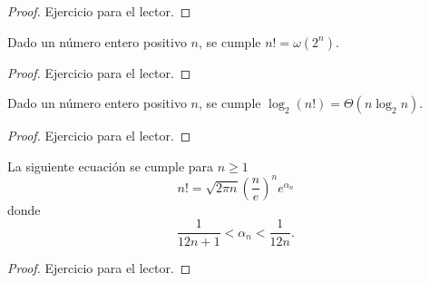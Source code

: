 \begin{proof}
    Ejercicio para el lector.
\end{proof}

\begin{theorem}
    Dado un n\'umero entero positivo $n$, se cumple $n! = \omega(2^n)$.
\end{theorem}

\begin{proof}
    Ejercicio para el lector.
\end{proof}

\begin{theorem}
    Dado un n\'umero entero positivo $n$, se cumple $\log_2(n!) = \Theta(n \log_2 n)$.
\end{theorem}

\begin{proof}
    Ejercicio para el lector.
\end{proof}

\begin{theorem}
    La siguiente ecuaci\'on se cumple para $n \geq 1$
    \[
        n! = \sqrt{2 \pi n} \left(\frac{n}{e}\right)^n e^{\alpha_n}
    \]
    donde
    \[
        \frac{1}{12n + 1} < \alpha_n < \frac{1}{12n}.
    \]
\end{theorem}

\begin{proof}
    Ejercicio para el lector.
\end{proof}



